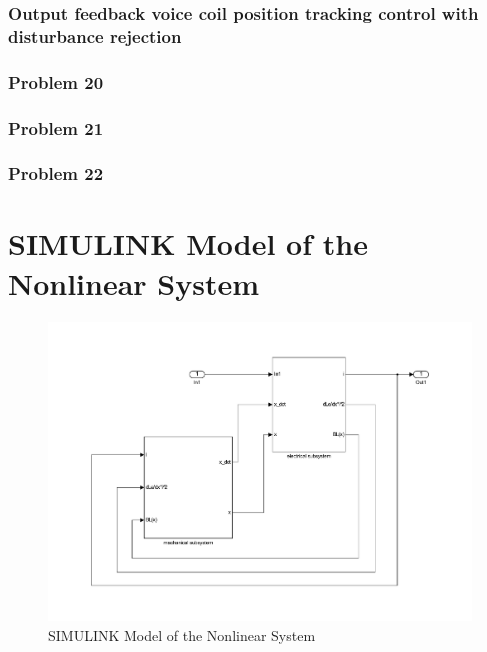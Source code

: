 \documentclass[12pt,a4paper,fleqn, onesside]{report}
\begin{document}
\subsection{Output feedback voice coil position tracking control with disturbance rejection}


\subsection*{Problem 20}


\subsection*{Problem 21}


\subsection*{Problem 22}


\appendix

\chapter{SIMULINK Model of the Nonlinear System}
\label{AppP2}
\begin{figure}[H]
 \centering 
 \includegraphics[trim=2cm 2cm 2cm 2cm, clip=true, totalheight=0.47\textheight, angle=0]{figures/figP2.pdf}
 \caption{SIMULINK Model of the Nonlinear System}
\label{fig:figP2}
\end{figure}
\end{document}
